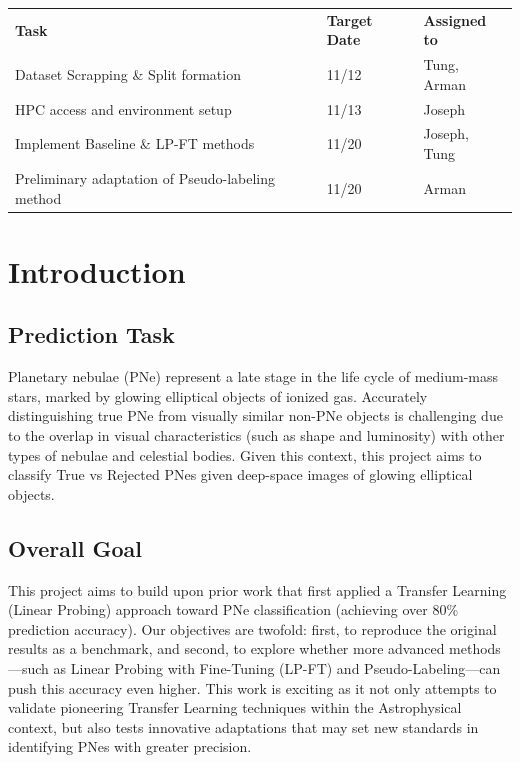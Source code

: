 \documentclass{article}
\begin{document}
\begin{table}[!h]
    \begin{tabular}{p{10cm} p{1cm} p{2cm}}
    \textbf{Task} & 
    \textbf{Target Date} & 
    \textbf{Assigned to}
    \\
    Dataset Scrapping \& Split formation & 11/12 & Tung, Arman
    \\
    HPC access and environment setup & 11/13 & Joseph
    \\
    Implement Baseline \& LP-FT methods & 11/20 & Joseph, Tung
    \\
    Preliminary adaptation of Pseudo-labeling method & 11/20 & Arman
    
    \end{tabular}
\end{table}

\newpage

\section{Introduction}

\subsection{Prediction Task}

Planetary nebulae (PNe) represent a late stage in the life cycle of medium-mass stars, marked by glowing elliptical objects of ionized gas. Accurately distinguishing true PNe from visually similar non-PNe objects is challenging due to the overlap in visual characteristics (such as shape and luminosity) with other types of nebulae and celestial bodies. Given this context, this project aims to classify True vs Rejected PNes given deep-space images of glowing elliptical objects.

\subsection{Overall Goal}

This project aims to build upon prior work that first applied a Transfer Learning (Linear Probing) approach toward PNe classification (achieving over 80\% prediction accuracy). Our objectives are twofold: first, to reproduce the original results as a benchmark, and second, to explore whether more advanced methods—such as Linear Probing with Fine-Tuning (LP-FT) and Pseudo-Labeling—can push this accuracy even higher. This work is exciting as it not only attempts to validate pioneering Transfer Learning techniques within the Astrophysical context, but also tests innovative adaptations that may set new standards in identifying PNes with greater precision.
\end{document}
